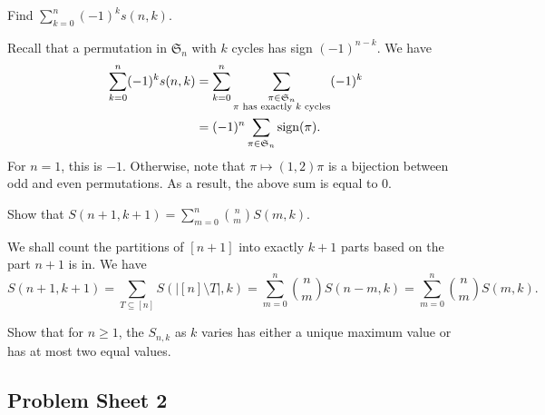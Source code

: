 	\begin{problem}
		Find $\sum_{k=0}^n (-1)^k s(n,k)$.
	\end{problem}
	\begin{solution*}
		Recall that a permutation in $\mathfrak{S}_n$ with $k$ cycles has sign $(-1)^{n-k}$. We have
		\begin{align*}
			\sum_{k=0}^n (-1)^k s(n,k) &= \sum_{k=0}^n \sum_{\substack{\pi \in \mathfrak{S}_n \\ \text{$\pi$ has exactly $k$ cycles}}} (-1)^k \\
				&= (-1)^n \sum_{\pi \in \mathfrak{S}_n} \operatorname{sign}(\pi).
		\end{align*}
		For $n=1$, this is $-1$. Otherwise, note that $\pi \mapsto (1,2) \pi$ is a bijection between odd and even permutations. As a result, the above sum is equal to $0$.
	\end{solution*}

	\begin{problem}
		Show that $S(n+1,k+1) = \sum_{m=0}^n \binom{n}{m} S(m,k)$.
	\end{problem}
	\begin{solution*}
		We shall count the partitions of $[n+1]$ into exactly $k+1$ parts based on the part $n+1$ is in. We have
		\[ S(n+1,k+1) = \sum_{T \subseteq [n]} S(|[n]\setminus T|,k) = \sum_{m=0}^n \binom{n}{m} S(n-m,k) = \sum_{m=0}^n \binom{n}{m} S(m,k). \]
	\end{solution*}


	\begin{problem}
		Show that for $n \ge 1$, the $S_{n,k}$ as $k$ varies has either a unique maximum value or has at most two equal values.
	\end{problem}
	\begin{solution*}
		
	\end{solution*}

\subsection{Problem Sheet 2}

